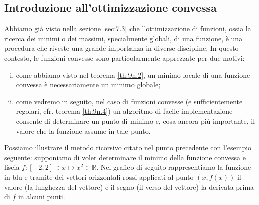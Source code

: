     \subsection{Introduzione all'ottimizzazione convessa}
    Abbiamo già visto nella sezione \ref{sec:7.3} che l'ottimizzazione di funzioni, ossia la ricerca dei minimi o dei massimi, specialmente globali, di una funzione, è una procedura che riveste una grande importanza in diverse discipline. In questo contesto, le funzioni convesse sono particolarmente apprezzate per due motivi:
    \begin{enumerate}[(i)]
        \item come abbiamo visto nel teorema \ref{th:9n.2}, un minimo locale di una funzione convessa è necessariamente un minimo globale;
        \item come vedremo in seguito, nel caso di funzioni convesse (e sufficientemente regolari, cfr. teorema \ref{th:9n.4}) un algoritmo di facile implementazione consente di determinare un punto di minimo e, cosa ancora più importante, il valore che la funzione assume in tale punto.
    \end{enumerate}
    Possiamo illustrare il metodo ricorsivo citato nel punto precedente con l'esempio seguente: supponiamo di voler determinare il minimo della funzione convessa e liscia $f\colon [-2, 2]\ni x \mapsto x^2\in\mathbb{R}$. Nel grafico di seguito rappresentiamo la funzione in blu e tramite dei vettori orizzontali rossi applicati al punto $(x,f(x))$ il valore (la lunghezza del vettore) e il segno (il verso del vettore) la derivata prima di $f$ in alcuni punti.
    \begin{center}
    \end{center}
